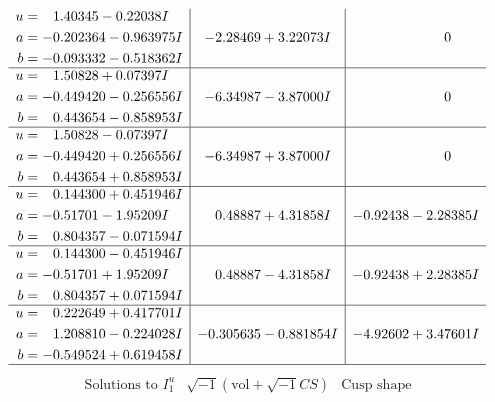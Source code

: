 \documentclass[1p]{elsarticle_modified}
\theoremstyle{definition}
\newcommand{\I}{\sqrt{-1}}
\begin{document}
$$\begin{array}{c|c|c}
\begin{aligned}
u &= \phantom{-}1.40345 - 0.22038 I \\
a &= -0.202364 - 0.963975 I \\
b &= -0.093332 - 0.518362 I\end{aligned}
 & -2.28469 + 3.22073 I & \phantom{-0.000000 } 0 \\ \hline\begin{aligned}
u &= \phantom{-}1.50828 + 0.07397 I \\
a &= -0.449420 - 0.256556 I \\
b &= \phantom{-}0.443654 - 0.858953 I\end{aligned}
 & -6.34987 - 3.87000 I & \phantom{-0.000000 } 0 \\ \hline\begin{aligned}
u &= \phantom{-}1.50828 - 0.07397 I \\
a &= -0.449420 + 0.256556 I \\
b &= \phantom{-}0.443654 + 0.858953 I\end{aligned}
 & -6.34987 + 3.87000 I & \phantom{-0.000000 } 0 \\ \hline\begin{aligned}
u &= \phantom{-}0.144300 + 0.451946 I \\
a &= -0.51701 - 1.95209 I \\
b &= \phantom{-}0.804357 - 0.071594 I\end{aligned}
 & \phantom{-}0.48887 + 4.31858 I & -0.92438 - 2.28385 I \\ \hline\begin{aligned}
u &= \phantom{-}0.144300 - 0.451946 I \\
a &= -0.51701 + 1.95209 I \\
b &= \phantom{-}0.804357 + 0.071594 I\end{aligned}
 & \phantom{-}0.48887 - 4.31858 I & -0.92438 + 2.28385 I \\ \hline\begin{aligned}
u &= \phantom{-}0.222649 + 0.417701 I \\
a &= \phantom{-}1.208810 - 0.224028 I \\
b &= -0.549524 + 0.619458 I\end{aligned}
 & -0.305635 - 0.881854 I & -4.92602 + 3.47601 I\\
 \hline 
 \end{array}$$\newpage$$\begin{array}{c|c|c}  
\text{Solutions to }I^u_{1}& \I (\text{vol} + \sqrt{-1}CS) & \text{Cusp shape}\\
 \hline 
\begin{aligned}

\end{aligned}
\end{array}$$
\end{document}
